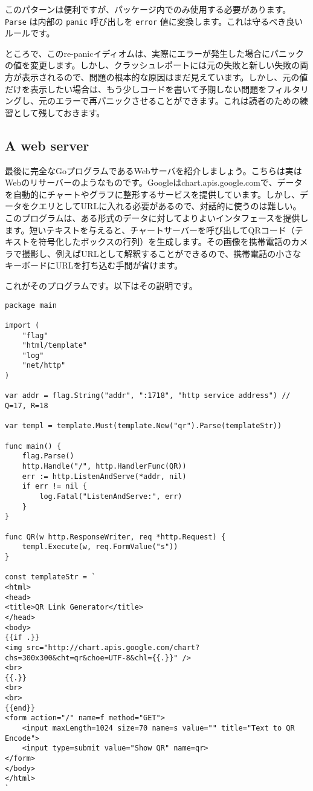 \documentclass{jsarticle}
\begin{document}
このパターンは便利ですが、パッケージ内でのみ使用する必要があります。\texttt{Parse}
は内部の \texttt{panic} 呼び出しを \texttt{error}
値に変換します。これは守るべき良いルールです。

ところで、このre-panicイディオムは、実際にエラーが発生した場合にパニックの値を変更します。しかし、クラッシュレポートには元の失敗と新しい失敗の両方が表示されるので、問題の根本的な原因はまだ見えています。しかし、元の値だけを表示したい場合は、もう少しコードを書いて予期しない問題をフィルタリングし、元のエラーで再パニックさせることができます。これは読者のための練習として残しておきます。

\subsection{A web server}

最後に完全なGoプログラムであるWebサーバを紹介しましょう。こちらは実はWebのリサーバーのようなものです。Googleはchart.apis.google.comで、データを自動的にチャートやグラフに整形するサービスを提供しています。しかし、データをクエリとしてURLに入れる必要があるので、対話的に使うのは難しい。このプログラムは、ある形式のデータに対してよりよいインタフェースを提供します。短いテキストを与えると、チャートサーバーを呼び出してQRコード（テキストを符号化したボックスの行列）を生成します。その画像を携帯電話のカメラで撮影し、例えばURLとして解釈することができるので、携帯電話の小さなキーボードにURLを打ち込む手間が省けます。

これがそのプログラムです。以下はその説明です。

\begin{lstlisting}[numbers=none]
package main

import (
    "flag"
    "html/template"
    "log"
    "net/http"
)

var addr = flag.String("addr", ":1718", "http service address") // Q=17, R=18

var templ = template.Must(template.New("qr").Parse(templateStr))

func main() {
    flag.Parse()
    http.Handle("/", http.HandlerFunc(QR))
    err := http.ListenAndServe(*addr, nil)
    if err != nil {
        log.Fatal("ListenAndServe:", err)
    }
}

func QR(w http.ResponseWriter, req *http.Request) {
    templ.Execute(w, req.FormValue("s"))
}

const templateStr = `
<html>
<head>
<title>QR Link Generator</title>
</head>
<body>
{{if .}}
<img src="http://chart.apis.google.com/chart?chs=300x300&cht=qr&choe=UTF-8&chl={{.}}" />
<br>
{{.}}
<br>
<br>
{{end}}
<form action="/" name=f method="GET">
    <input maxLength=1024 size=70 name=s value="" title="Text to QR Encode">
    <input type=submit value="Show QR" name=qr>
</form>
</body>
</html>
`
\end{lstlisting}
\end{document}
